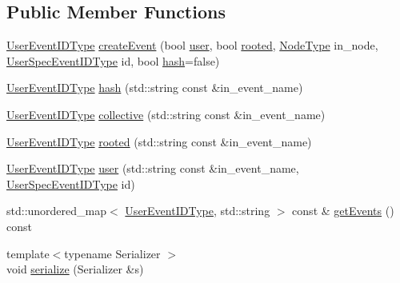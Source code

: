 \subsection*{Public Member Functions}
\begin{DoxyCompactItemize}
\item 
\hyperlink{namespacevt_1_1trace_a5908920d051c144c89f17c69ed262350}{User\+Event\+I\+D\+Type} \hyperlink{structvt_1_1trace_1_1_user_event_registry_ac219431476480a6c9fe10ede067b33d2}{create\+Event} (bool \hyperlink{structvt_1_1trace_1_1_user_event_registry_a6a2156b87f22007a4a20ca1b7e96d2fe}{user}, bool \hyperlink{structvt_1_1trace_1_1_user_event_registry_a8b940e39914a9d3ba1acf0a219f6d44d}{rooted}, \hyperlink{namespacevt_a866da9d0efc19c0a1ce79e9e492f47e2}{Node\+Type} in\+\_\+node, \hyperlink{namespacevt_1_1trace_a70c43e0e1596eea236912d4197d3120a}{User\+Spec\+Event\+I\+D\+Type} id, bool \hyperlink{structvt_1_1trace_1_1_user_event_registry_a99ef8a7f7df7a11fac6ada816f83cfbf}{hash}=false)
\item 
\hyperlink{namespacevt_1_1trace_a5908920d051c144c89f17c69ed262350}{User\+Event\+I\+D\+Type} \hyperlink{structvt_1_1trace_1_1_user_event_registry_a99ef8a7f7df7a11fac6ada816f83cfbf}{hash} (std\+::string const \&in\+\_\+event\+\_\+name)
\item 
\hyperlink{namespacevt_1_1trace_a5908920d051c144c89f17c69ed262350}{User\+Event\+I\+D\+Type} \hyperlink{structvt_1_1trace_1_1_user_event_registry_a351d80d6d91bcd47e9fff0f6ed18df4d}{collective} (std\+::string const \&in\+\_\+event\+\_\+name)
\item 
\hyperlink{namespacevt_1_1trace_a5908920d051c144c89f17c69ed262350}{User\+Event\+I\+D\+Type} \hyperlink{structvt_1_1trace_1_1_user_event_registry_a8b940e39914a9d3ba1acf0a219f6d44d}{rooted} (std\+::string const \&in\+\_\+event\+\_\+name)
\item 
\hyperlink{namespacevt_1_1trace_a5908920d051c144c89f17c69ed262350}{User\+Event\+I\+D\+Type} \hyperlink{structvt_1_1trace_1_1_user_event_registry_a6a2156b87f22007a4a20ca1b7e96d2fe}{user} (std\+::string const \&in\+\_\+event\+\_\+name, \hyperlink{namespacevt_1_1trace_a70c43e0e1596eea236912d4197d3120a}{User\+Spec\+Event\+I\+D\+Type} id)
\item 
std\+::unordered\+\_\+map$<$ \hyperlink{namespacevt_1_1trace_a5908920d051c144c89f17c69ed262350}{User\+Event\+I\+D\+Type}, std\+::string $>$ const  \& \hyperlink{structvt_1_1trace_1_1_user_event_registry_aaa8cbfc8f3596bb5f9aa97cccd72f890}{get\+Events} () const
\item 
{\footnotesize template$<$typename Serializer $>$ }\\void \hyperlink{structvt_1_1trace_1_1_user_event_registry_ae2ab385a6ce4a4b0c2afd1a408ba7f6e}{serialize} (Serializer \&s)
\end{DoxyCompactItemize}
